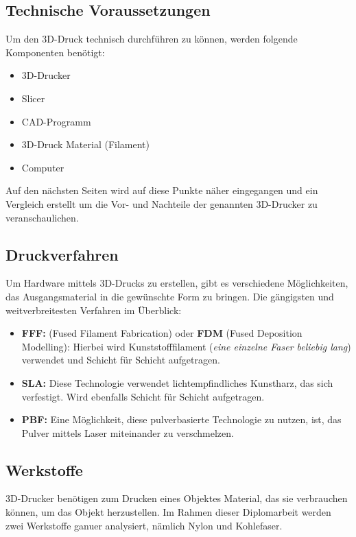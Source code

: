 \subsection{Technische Voraussetzungen}
Um den 3D-Druck technisch durchführen zu können, werden folgende Komponenten benötigt:
\begin{itemize} 
	\item 3D-Drucker
	\item Slicer
	\item CAD-Programm
	\item 3D-Druck Material (Filament)
	\item Computer
\end{itemize}
Auf den nächsten Seiten wird auf diese Punkte näher eingegangen und ein Vergleich erstellt um die Vor- und Nachteile \parencite{3ds} der genannten 3D-Drucker zu veranschaulichen. 


\subsection{Druckverfahren}

Um Hardware mittels 3D-Drucks zu erstellen, gibt es verschiedene Möglichkeiten, das Ausgangsmaterial \parencite{3ds} in die gewünschte Form zu bringen. Die gängigsten und weitverbreitesten Verfahren \parencite{kaffka} im Überblick: 

\begin{itemize}
	\item \textbf{FFF:} (Fused Filament Fabrication) oder \textbf{FDM} (Fused Deposition Modelling): Hierbei wird Kunststofffilament (\textit{eine einzelne Faser beliebig lang}) verwendet und Schicht für Schicht aufgetragen.
	\item \textbf{SLA:} Diese Technologie verwendet lichtempfindliches Kunstharz, das sich verfestigt. Wird ebenfalls Schicht für Schicht aufgetragen.
	\item \textbf{PBF:} Eine Möglichkeit, diese pulverbasierte Technologie zu nutzen, ist, das Pulver mittels Laser miteinander zu verschmelzen.  
\end{itemize}


\subsection{Werkstoffe}
3D-Drucker benötigen zum Drucken eines Objektes Material, das sie verbrauchen können, um das Objekt herzustellen. Im Rahmen dieser Diplomarbeit werden zwei Werkstoffe ganuer analysiert, nämlich Nylon und Kohlefaser.

